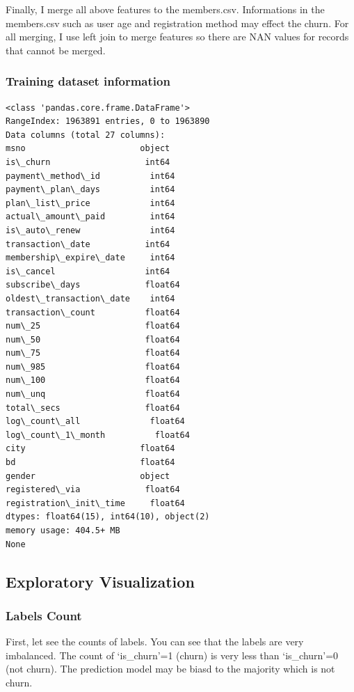 \documentclass[11pt]{article}
\begin{document}
Finally, I merge all above features to the members.csv. Informations in
the members.csv such as user age and registration method may effect the
churn. For all merging, I use left join to merge features so there are
NAN values for records that cannot be merged.

    \subsubsection{Training dataset
information}\label{training-dataset-information}

    \begin{Verbatim}[commandchars=\\\{\}]
<class 'pandas.core.frame.DataFrame'>
RangeIndex: 1963891 entries, 0 to 1963890
Data columns (total 27 columns):
msno                       object
is\_churn                   int64
payment\_method\_id          int64
payment\_plan\_days          int64
plan\_list\_price            int64
actual\_amount\_paid         int64
is\_auto\_renew              int64
transaction\_date           int64
membership\_expire\_date     int64
is\_cancel                  int64
subscribe\_days             float64
oldest\_transaction\_date    int64
transaction\_count          float64
num\_25                     float64
num\_50                     float64
num\_75                     float64
num\_985                    float64
num\_100                    float64
num\_unq                    float64
total\_secs                 float64
log\_count\_all              float64
log\_count\_1\_month          float64
city                       float64
bd                         float64
gender                     object
registered\_via             float64
registration\_init\_time     float64
dtypes: float64(15), int64(10), object(2)
memory usage: 404.5+ MB
None

    \end{Verbatim}

    \subsection{Exploratory Visualization}\label{exploratory-visualization}

\subsubsection{Labels Count}\label{labels-count}

First, let see the counts of labels. You can see that the labels are
very imbalanced. The count of `is\_churn'=1 (churn) is very less than
`is\_churn'=0 (not churn). The prediction model may be biasd to the
majority which is not churn.
\end{document}
